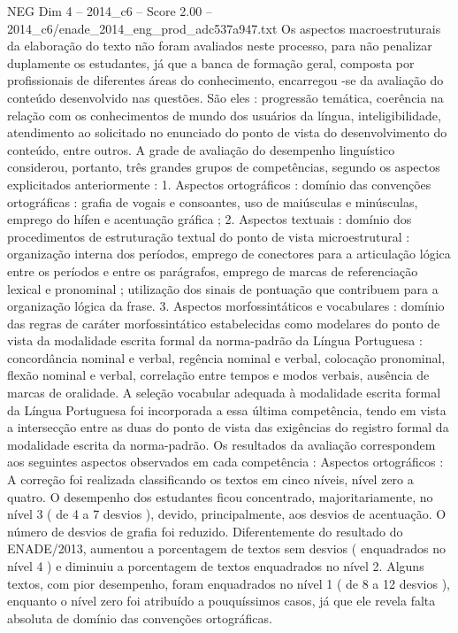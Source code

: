 \begin{textsample}{NEG Dim 4 – 2014\_c6 – Score 2.00 – 2014\_c6/enade\_2014\_eng\_prod\_adc537a947.txt}
Os aspectos macroestruturais da elaboração do texto não foram avaliados neste processo, para não penalizar duplamente os estudantes, já que a banca de formação geral, composta por profissionais de diferentes áreas do conhecimento, encarregou -se da avaliação do conteúdo desenvolvido nas questões.
São eles : progressão temática, coerência na relação com os conhecimentos de mundo dos usuários da língua, inteligibilidade, atendimento ao solicitado no enunciado do ponto de vista do desenvolvimento do conteúdo, entre outros.
A grade de avaliação do desempenho linguístico considerou, portanto, três grandes grupos de competências, segundo os aspectos explicitados anteriormente : 1.
Aspectos ortográficos : domínio das convenções ortográficas : grafia de vogais e consoantes, uso de maiúsculas e minúsculas, emprego do hífen e acentuação gráfica ; 2.
Aspectos textuais : domínio dos procedimentos de estruturação textual do ponto de vista microestrutural : organização interna dos períodos, emprego de conectores para a articulação lógica entre os períodos e entre os parágrafos, emprego de marcas de referenciação lexical e pronominal ; utilização dos sinais de pontuação que contribuem para a organização lógica da frase. 3.
Aspectos morfossintáticos e vocabulares : domínio das regras de caráter morfossintático estabelecidas como modelares do ponto de vista da modalidade escrita formal da norma-padrão da Língua Portuguesa : concordância nominal e verbal, regência nominal e verbal, colocação pronominal, flexão nominal e verbal, correlação entre tempos e modos verbais, ausência de marcas de oralidade.
A seleção vocabular adequada à modalidade escrita formal da Língua Portuguesa foi incorporada a essa última competência, tendo em vista a intersecção entre as duas do ponto de vista das exigências do registro formal da modalidade escrita da norma-padrão.
Os resultados da avaliação correspondem aos seguintes aspectos observados em cada competência : Aspectos ortográficos : A correção foi realizada classificando os textos em cinco níveis, nível zero a quatro.
O desempenho dos estudantes ficou concentrado, majoritariamente, no nível 3 ( de 4 a 7 desvios ), devido, principalmente, aos desvios de acentuação.
O número de desvios de grafia foi reduzido.
Diferentemente do resultado do ENADE/2013, aumentou a porcentagem de textos sem desvios ( enquadrados no nível 4 ) e diminuiu a porcentagem de textos enquadrados no nível 2.
Alguns textos, com pior desempenho, foram enquadrados no nível 1 ( de 8 a 12 desvios ), enquanto o nível zero foi atribuído a pouquíssimos casos, já que ele revela falta absoluta de domínio das convenções ortográficas.

\end{textsample}
